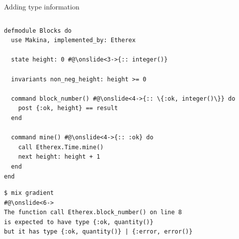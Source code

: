 \documentclass[aspectratio=169, 10pt]{beamer}
\begin{document}
\begin{frame}[label={sec:org7b98411},fragile]{Adding type information}
 \begin{columns}
\begin{column}{0.58\columnwidth}
\onslide<+->
\onslide<+->
\lstset{language=elixir,label= ,caption= ,captionpos=b,numbers=none,style=display, numbers=left}
\begin{lstlisting}
defmodule Blocks do
  use Makina, implemented_by: Etherex

  state height: 0 #@\onslide<3->{:: integer()}

  invariants non_neg_height: height >= 0

  command block_number() #@\onslide<4->{:: \{:ok, integer()\}} do
    post {:ok, height} == result
  end

  command mine() #@\onslide<4->{:: :ok} do
    call Etherex.Time.mine()
    next height: height + 1
  end
end
\end{lstlisting}
\lstset{language=bash,label= ,caption= ,captionpos=b,numbers=none,style=shell}
\begin{lstlisting}
$ mix gradient
#@\onslide<6->
The function call Etherex.block_number() on line 8
is expected to have type {:ok, quantity()}
but it has type {:ok, quantity()} | {:error, error()}
\end{lstlisting}
\end{column}
\end{columns}
\end{frame}
\end{document}
